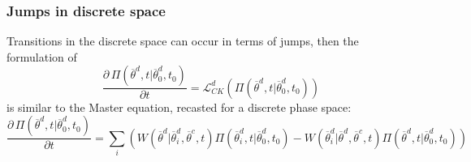 %
%
%
%
\subsubsection{Jumps in discrete space }
\label{subsec:CKJumpsDiscrete}
Transitions in the discrete space can occur in terms of jumps, then the formulation of 
\begin{equation}
\frac{\partial \, \Pi \left (\overline{\theta}^{d},t|\overline{\theta}^{d}_{0},t_{0}  \right ) }{\partial t} =  
\mathcal{L}_{CK}^{d}\left ( \Pi \left (\overline{\theta}^{d},t|\overline{\theta}_{0}^{d},t_{0}  
\right )  \right )
\end{equation}
is similar to the Master equation, recasted for a discrete phase space:
\begin{equation}
\frac{\partial \, \Pi \left (\overline{\theta}^{d},t|\overline{\theta}^{d}_{0},t_{0}  \right ) }{\partial t} =  \sum_{i} \left (  W\left ( \overline{\theta}^{d}|
\overline{\theta}^{d}_{i},\overline{\theta}^{c},t \right )\Pi \left (\overline{\theta}^{d}_{i},t|\overline{\theta}^{d}_{0},t_{0}  
\right ) - W\left ( \overline{\theta}^{d}_{i}|
\overline{\theta}^{d},\overline{\theta}^{c},t \right )\Pi \left (\overline{\theta}^{d},t|\overline{\theta}_{0}^{d},t_{0}  
\right )  \right ) 
\end{equation}

%
%
%
%
%
%
%
%
%
%
%
%




